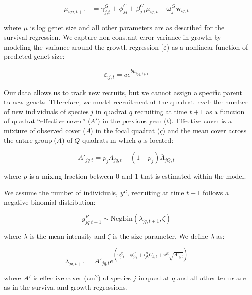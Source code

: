\documentclass[12pt,]{article}
\begin{document}
\begin{align}
\mu_{ijg,t+1} &= \gamma^{G}_{j,t} + \phi^{G}_{jg} + \beta^{G}_{j,t}\mu_{ij,t} + \boldsymbol{\omega}^{G}_{j} \textbf{w}_{ij,t}
\end{align}

where \(\mu\) is log genet size and all other parameters are as
described for the survival regression. We capture non-constant error
variance in growth by modeling the variance around the growth regression
(\(\varepsilon\)) as a nonlinear function of predicted genet size:

\begin{align}
\varepsilon_{ij,t} = a e^{b \mu_{ijg,t+1}}
\end{align}

Our data allows us to track new recruits, but we cannot assign a
specific parent to new genets. THerefore, we model recruitment at the
quadrat level: the number of new individuals of species \(j\) in quadrat
\(q\) recruiting at time \(t+1\) as a function of quadrat ``effective
cover'' (\(A'\)) in the previous year (\(t\)). Effective cover is a
mixture of observed cover (\(A\)) in the focal quadrat (\(q\)) and the
mean cover across the entire group (\(\bar{A}\)) of \(Q\) quadrats in
which \(q\) is located:

\begin{equation}
A'_{jq,t} = p_{j}A_{jq,t} + (1-p_{j})\bar{A}_{jQ,t}
\end{equation}

where \(p\) is a mixing fraction between 0 and 1 that is estimated
within the model.

We assume the number of individuals, \(y^{R}\), recruiting at time
\(t+1\) follows a negative binomial distribution:

\begin{equation}
y^{R}_{jq,t+1} \sim \text{NegBin}(\lambda_{jq,t+1},\zeta)
\end{equation}

where \(\lambda\) is the mean intensity and \(\zeta\) is the size
parameter. We define \(\lambda\) as:

\begin{equation}
\lambda_{jq,t+1} = A'_{jq,t}e^{(\gamma^{R}_{j,t} + \phi^{R}_{jQ} + \theta^{R}_{jk}C_{k,t} + \omega^{R}\sqrt{A'_{q,t}})}
\end{equation}

where \(A'\) is effective cover (\(\text{cm}^2\)) of species \(j\) in
quadrat \(q\) and all other terms are as in the survival and growth
regressions.
\end{document}
